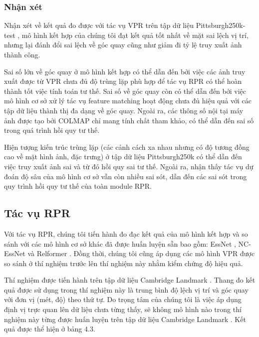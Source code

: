 \subsubsection*{Nhận xét}
Nhận xét về kết quả đo được với tác vụ VPR trên tập dữ liệu Pittsburgh250k-test \cite{6618963}, mô hình kết hợp của chúng tôi đạt kết quả tốt nhất về mặt sai lệch vị trí, nhưng lại đánh đổi sai lệch về góc quay cũng như giảm đi tỷ lệ truy xuất ảnh thành công. 

Sai số lớn về góc quay ở mô hình kết hợp có thể dẫn đến bởi việc các ảnh truy xuất được từ VPR chưa đủ độ trùng lặp phù hợp để tác vụ RPR có thể hoàn thành tốt việc tính toán tư thế. Sai số về góc quay còn có thể dẫn đến bởi việc mô hình cơ sở xử lý tác vụ feature matching hoạt động chưa đủ hiệu quả với các tập dữ liệu thành thị đa dạng về góc quay. Ngoài ra, các thông số nội tại máy ảnh được tạo bởi COLMAP chỉ mang tính chất tham khảo, có thể dẫn đến sai số trong quá trình hồi quy tư thế.

Hiện tượng kiến trúc trùng lặp (các cảnh cách xa nhau nhưng có độ tương đồng cao về mặt hình ảnh, đặc trưng) ở tập dữ liệu Pittsburgh250k \cite{6618963} có thể dẫn đến việc truy xuất ảnh sai và từ đó hồi quy sai tư thế. Ngoài ra, nhận thấy tác vụ dự đoán độ sâu của mô hình cơ sở vẫn còn nhiều sai sót, dẫn đến các sai sót trong quy trình hồi quy tư thế của toàn module RPR.

\subsection*{Tác vụ RPR}

Với tác vụ RPR, chúng tôi tiến hành đo đạc kết quả của mô hình kết hợp và so sánh với các mô hình cơ sở khác đã được huấn luyện sẵn bao gồm: EssNet \cite{zhou2020learn}, NC-EssNet \cite{zhou2020learn} và Relformer \cite{idan2023learning}. Đồng thời, chúng tôi cũng áp dụng các mô hình VPR được so sánh ở thí nghiệm trước lên thí nghiệm này nhằm kiểm chứng độ hiệu quả. 

Thí nghiệm được tiến hành trên tập dữ liệu Cambridge Landmark \cite{kendall2016posenet}. Thang đo kết quả được sử dụng trong thí nghiệm này là trung bình độ lệch vị trí và góc quay với đơn vị (mét, độ) theo thứ tự. Do trọng tâm của chúng tôi là việc áp dụng định vị trực quan lên dữ liệu chưa từng thấy, sẽ không mô hình nào trong thí nghiệm này từng được huấn luyện trên tập dữ liệu Cambridge Landmark \cite{kendall2016posenet}. Kết quả được thể hiện ở bảng 4.3.

